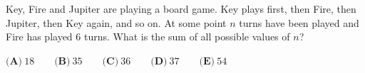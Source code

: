 Key, Fire and Jupiter are playing a board game. Key plays first, then Fire, then Jupiter, then Key again, and so on. At some point $n$ turns have been played and Fire has played $6$ turns. What is the sum of all possible values of $n$?

$\textbf{(A)}\ 18\qquad\textbf{(B)}\ 35\qquad\textbf{(C)}\ 36\qquad\textbf{(D)}\ 37\qquad\textbf{(E)}\ 54$
